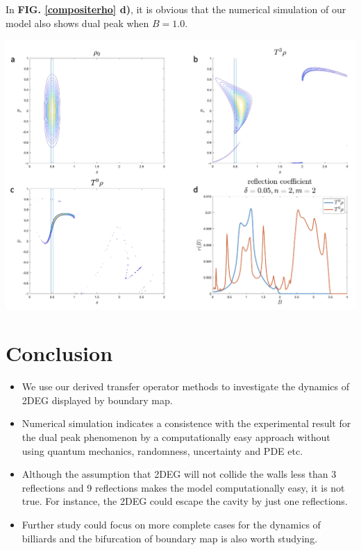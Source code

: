 \documentclass[a0,portrait]{a0poster}
\begin{document}
\begin{multicols}{3}
In \textbf{FIG. \ref{compositerho} d)}, it is obvious that the numerical simulation of our model also shows dual peak when $B=1.0$.
\begin{center}\vspace{1cm}
\includegraphics[width=0.85\linewidth]{compositerho.png}
\label{compositerho}
\end{center}%


\section*{Conclusion}
\begin{itemize}
    \item We use our derived transfer operator methods to investigate the dynamics of 2DEG displayed by boundary map.
    \item Numerical simulation indicates a consistence with the experimental result for the dual peak phenomenon by a computationally easy approach without using quantum mechanics, randomness, uncertainty and PDE etc.
    \item Although the assumption that 2DEG will not collide the walls less than 3 reflections and 9 reflections makes the model computationally easy, it is not true. For instance, the 2DEG could escape the cavity by just one reflections.
    \item Further study could focus on more complete cases for the dynamics of billiards and the bifurcation of boundary map is also worth studying.
\end{itemize}


\end{multicols}
\end{document}
